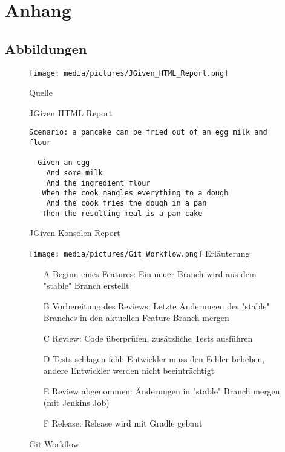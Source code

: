 \documentclass[00_Praxissemesterbericht.tex]{subfiles}
\begin{document}
\chapter*{Anhang}
\label{chap:APPENDIX}
\addtocounter{chapter}{1}
\setcounter{section}{0}

\section{Abbildungen}
\label{chap:APPENDIX_FIGURES}

\begin{figure}[!htbp]
\caption{JGiven HTML Report}
\label{fig:JGIVEN_HTML}
\texttt{[image: media/pictures/JGiven\_HTML\_Report.png]}
\begin{center}
Quelle \cite{JGiven}
\end{center}
\end{figure}

\begin{figure}[!htbp]
\caption{JGiven Konsolen Report}
\label{fig:JGIVEN_TEXT_REPORT}
\begin{verbatim}
Scenario: a pancake can be fried out of an egg milk and flour

  Given an egg
    And some milk
    And the ingredient flour
   When the cook mangles everything to a dough
    And the cook fries the dough in a pan
   Then the resulting meal is a pan cake
\end{verbatim}
\end{figure}

\begin{figure}[!htbp]
\caption{Git Workflow}
\label{fig:GIT_WORKFLOW}
\texttt{[image: media/pictures/Git\_Workflow.png]}
Erläuterung:
\begin{itemize}
\item[A]{Beginn eines Features: Ein neuer Branch wird aus dem "{}stable"{} Branch erstellt}
\item[B]{Vorbereitung des Reviews: Letzte Änderungen des "{}stable"{} Branches in den aktuellen Feature Branch mergen}
\item[C]{Review: Code überprüfen, zusätzliche Tests ausführen}
\item[D]{Tests schlagen fehl: Entwickler muss den Fehler beheben, andere Entwickler werden nicht beeinträchtigt}
\item[E]{Review abgenommen: Änderungen in "{}stable"{} Branch mergen (mit Jenkins Job)}
\item[F]{Release: Release wird mit Gradle gebaut}
\end{itemize}
\end{figure}
\end{document}
